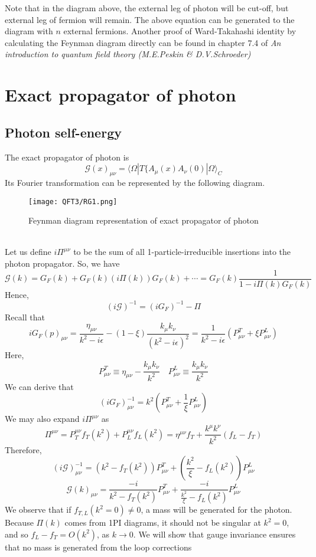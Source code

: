 \documentclass[cyan]{elegantnote}
\begin{document}
Note that in the diagram above, the external leg of photon will be cut-off, but external leg of fermion will remain.
The above equation can be generated to the diagram with $n$ external fermions. 
Another proof of Ward-Takahashi identity by calculating the Feynman diagram directly can be found in chapter 7.4 of \emph{An introduction to quantum field theory (M.E.Peskin \& D.V.Schroeder)}

\section{Exact propagator of photon}
\subsection{Photon self-energy}
\noindent
The exact propagator of photon is
\[\mathcal{G}(x)_{\mu\nu} = \langle  \Omega | T \{ A_{\mu}(x)A_{\nu}(0)| \Omega \rangle_C\]
Its Fourier transformation can be represented by the following diagram. 
\begin{figure}[!h]
\centering
\texttt{[image: QFT3/RG1.png]}
\caption{Feynman diagram representation of exact propagator of photon}
\end{figure}\\
Let us define $i\Pi^{\mu\nu}$ to be the sum of all 1-particle-irreducible insertions into the photon propagator. So, we have
\[\mathcal{G}(k) = G_F(k) + G_F(k)(i\Pi(k))G_F(k) + \cdots = G_F(k) \frac{1}{1-i\Pi(k)G_F(k)}\]
Hence,
\[(i\mathcal{G})^{-1} = (iG_F)^{-1} - \Pi\]
Recall that
\[iG_F(p)_{\mu\nu}  = \frac{\eta_{\mu\nu}}{k^2-i\epsilon} - (1-\xi)\frac{k_{\mu}k_{\nu}}{(k^2-i\epsilon)^2} = \frac{1}{k^2-i\epsilon}(P^T_{\mu\nu} + \xi P^L_{\mu\nu})\]
Here, \[P^T_{\mu\nu} \equiv \eta_{\mu\nu} - \frac{k_{\mu}k_{\nu}}{k^2} \quad  P^L_{\mu\nu} \equiv \frac{k_{\mu}k_{\nu}}{k^2}\]
We can derive that
\[(iG_F)^{-1}_{\mu\nu} = k^2 (P^T_{\mu\nu} + \frac{1}{\xi} P^L_{\mu\nu})\]
We may also expand $i\Pi^{\mu\nu}$ as
\[\Pi^{\mu\nu} = P_T^{\mu\nu}f_T(k^2) +  P_L^{\mu\nu}f_L(k^2) = \eta^{\mu\nu}f_T + \frac{k^{\mu}k^{\nu}}{k^2}(f_L-f_T)\]
Therefore,
\[(i\mathcal{G})^{-1}_{\mu\nu} = (k^2-f_T(k^2))P^T_{\mu\nu} + (\frac{k^2}{\xi}-f_L(k^2)) P^L_{\mu\nu}\]
\[\mathcal{G}(k)_{\mu\nu} = \frac{-i}{k^2-f_T(k^2)}P^T_{\mu\nu} + \frac{-i}{\frac{k^2}{\xi}-f_L(k^2)} P^L_{\mu\nu}\]
We observe that if $f_{T,L}(k^2 = 0) \neq 0$, a mass will be generated for the photon. Because $\Pi(k)$ comes from 1PI diagrams, it should not be singular at $k^2 =0 $, and so $f_L - f_T = O(k^2)$, as $k \to 0$. We will show that gauge invariance ensures that no mass is generated from the loop corrections
\end{document}
